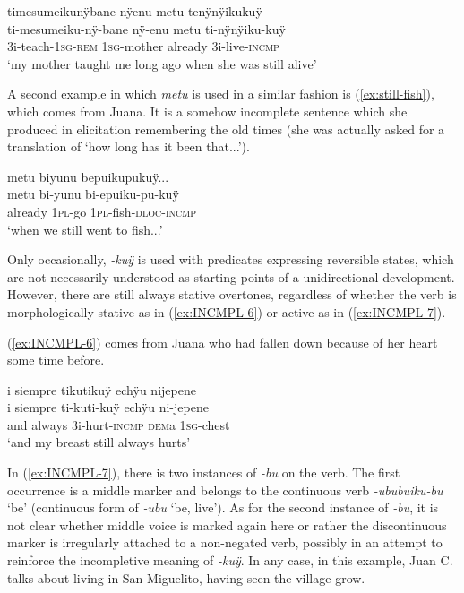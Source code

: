 \ea\label{ex:still-alive}
\begingl
\glpreamble timesumeikunÿbane nÿenu metu tenÿnÿikukuÿ\\
\gla ti-mesumeiku-nÿ-bane nÿ-enu metu ti-nÿnÿiku-kuÿ\\
\glb 3i-teach-1\textsc{sg}-\textsc{rem} 1\textsc{sg}-mother already 3i-live-\textsc{incmp}\\
\glft ‘my mother taught me long ago when she was still alive’
\endgl
\trailingcitation{[rxx-e181022le]}
\xe

A second example in which \textit{metu} is used in a similar fashion is (\ref{ex:still-fish}), which comes from Juana. It is a somehow incomplete sentence which she produced in elicitation remembering the old times (she was actually asked for a translation of ‘how long has it been that...’).

\ea\label{ex:still-fish}
\begingl
\glpreamble metu biyunu bepuikupukuÿ...\\
\gla metu bi-yunu bi-epuiku-pu-kuÿ\\
\glb already 1\textsc{pl}-go 1\textsc{pl}-fish-\textsc{dloc}-\textsc{incmp}\\
\glft ‘when we still went to fish...’
\endgl
\trailingcitation{[jxx-e190210s-01]}
\xe


Only occasionally, \textit{-kuÿ} is used with predicates expressing reversible states, which are not necessarily understood as starting points of a unidirectional development. However, there are still always stative overtones, regardless of whether the verb is morphologically stative as in (\ref{ex:INCMPL-6}) or active as in (\ref{ex:INCMPL-7}).

(\ref{ex:INCMPL-6}) comes from Juana who had fallen down because of her heart some time before.

\ea\label{ex:INCMPL-6}
\begingl
\glpreamble i siempre tikutikuÿ echÿu nijepene\\
\gla i siempre ti-kuti-kuÿ echÿu ni-jepene\\
\glb and always 3i-hurt-\textsc{incmp} \textsc{dem}a 1\textsc{sg}-chest\\
\glft ‘and my breast still always hurts’
\endgl
\trailingcitation{[jxx-p120430l-1.322]}
\xe

In (\ref{ex:INCMPL-7}), there is two instances of \textit{-bu} on the verb. The first occurrence is a middle marker and belongs to the continuous verb \textit{-ububuiku-bu} ‘be’ (continuous form of \textit{-ubu} ‘be, live’). As for the second instance of \textit{-bu}, it is not clear whether middle voice is marked again here or rather the discontinuous marker is irregularly attached to a non-negated verb, possibly in an attempt to reinforce the incompletive meaning of \textit{-kuÿ}. In any case, in this example, Juan C. talks about living in San Miguelito, having seen the village grow.

